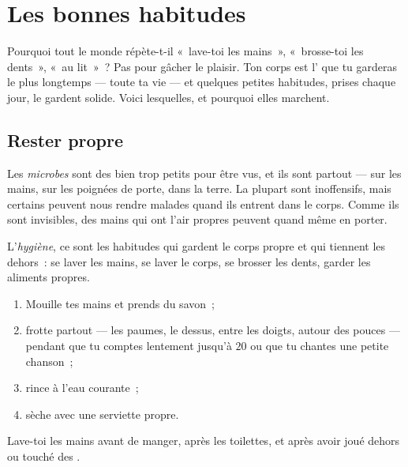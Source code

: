 \chapter{Les bonnes habitudes}\label{ch:g1:healthy-habits}

Pourquoi tout le monde répète-t-il «~lave-toi les mains~», «~brosse-toi
les dents~», «~au lit~»~? Pas pour gâcher le plaisir. Ton corps est
l' que tu garderas le plus longtemps --- toute ta vie ---
et quelques petites habitudes, prises chaque jour, le gardent solide.
Voici lesquelles, et pourquoi elles marchent.

\section{Rester propre}

\begin{definition}\label{def:g1:healthy-habits:germs}
Les \emph{microbes} sont des  bien trop
petits pour être vus, et ils sont partout --- sur les mains, sur les
poignées de porte, dans la terre. La plupart sont inoffensifs, mais
certains peuvent nous rendre malades quand ils entrent dans le
corps. Comme ils sont invisibles, des mains qui ont l'air propres
peuvent quand même en porter.
\end{definition}

\begin{definition}[Hygiène]\label{def:g1:healthy-habits:hygiene}
L'\emph{hygiène}, ce sont les habitudes qui gardent
le corps propre et qui tiennent les  dehors~: se laver les
mains, se laver le corps, se brosser les dents, garder les aliments
propres.
\end{definition}

\begin{method}\label{met:g1:healthy-habits:hands}
\begin{enumerate}
  \item Mouille tes mains et prends du savon~;
  \item frotte partout --- les paumes, le dessus, entre les doigts,
        autour des pouces --- pendant que tu comptes lentement
        jusqu'à $20$ ou que tu chantes une petite chanson~;
  \item rince à l'eau courante~;
  \item sèche avec une serviette propre.
\end{enumerate}
Lave-toi les mains avant de manger, après les toilettes, et après
avoir joué dehors ou touché des .
\end{method}

